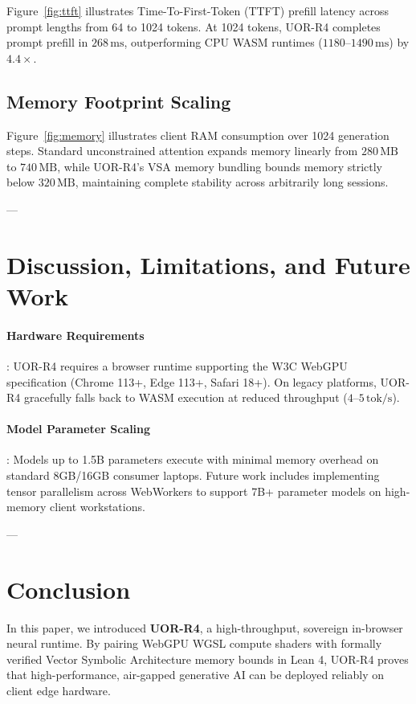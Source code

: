 \documentclass[11pt,a4paper]{article}
\theoremstyle{plain}
\theoremstyle{definition}
\theoremstyle{remark}
\begin{document}
Figure~\ref{fig:ttft} illustrates Time-To-First-Token (TTFT) prefill latency across prompt lengths from 64 to 1024 tokens. At 1024 tokens, UOR-R4 completes prompt prefill in $268\,\text{ms}$, outperforming CPU WASM runtimes ($1180\text{--}1490\,\text{ms}$) by $\mathbf{4.4\times}$.

\subsection{Memory Footprint Scaling}

Figure~\ref{fig:memory} illustrates client RAM consumption over 1024 generation steps. Standard unconstrained attention expands memory linearly from $280\,\text{MB}$ to $740\,\text{MB}$, while UOR-R4's VSA memory bundling bounds memory strictly below $320\,\text{MB}$, maintaining complete stability across arbitrarily long sessions.

---

\section{Discussion, Limitations, and Future Work}
\label{sec:discussion}

\paragraph{Hardware Requirements}: UOR-R4 requires a browser runtime supporting the W3C WebGPU specification (Chrome 113+, Edge 113+, Safari 18+). On legacy platforms, UOR-R4 gracefully falls back to WASM execution at reduced throughput ($4\text{--}5\,\text{tok/s}$).

\paragraph{Model Parameter Scaling}: Models up to 1.5B parameters execute with minimal memory overhead on standard 8GB/16GB consumer laptops. Future work includes implementing tensor parallelism across WebWorkers to support 7B+ parameter models on high-memory client workstations.

---

\section{Conclusion}
\label{sec:conclusion}

In this paper, we introduced \textbf{UOR-R4}, a high-throughput, sovereign in-browser neural runtime. By pairing WebGPU WGSL compute shaders with formally verified Vector Symbolic Architecture memory bounds in Lean 4, UOR-R4 proves that high-performance, air-gapped generative AI can be deployed reliably on client edge hardware.



\end{document}
